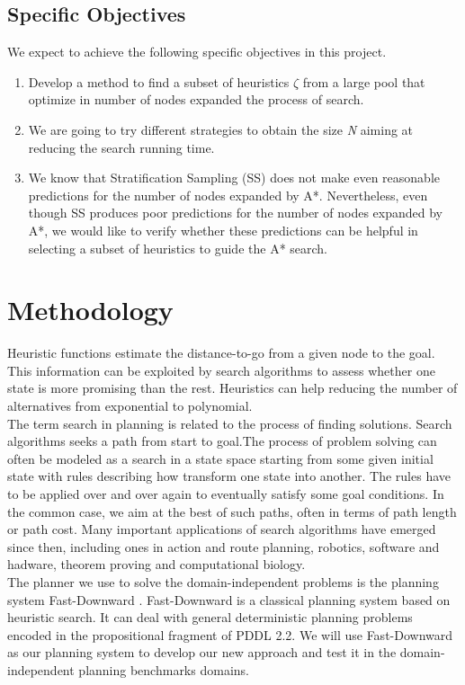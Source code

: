 \documentclass[a4paper,12pt]{article}
\begin{document}
\subsection{Specific Objectives}
We expect to achieve the following specific objectives in this project.
\begin{enumerate}
\item Develop a method to find a subset of heuristics $\zeta$ from a large pool that optimize in number of nodes expanded the process of search.
\item We are going to try different strategies to obtain the size \textit{N} aiming at reducing the search running time.
\item We know that Stratification Sampling (SS) does not make even reasonable predictions for the number of nodes expanded by A*. Nevertheless, even though SS produces poor predictions for the number of nodes expanded by A*, we would like to verify whether these predictions can be helpful in selecting a subset of heuristics to guide the A* search.
\end{enumerate}

\section{Methodology}
Heuristic functions estimate the distance-to-go from a given node to the goal. This information can be exploited by search algorithms to assess whether one state is more promising than the rest. Heuristics can help reducing the number of alternatives from exponential to polynomial.\\

The term search in planning is related to the process of finding solutions.       
Search algorithms seeks a path from start to goal.The process of problem solving can often be modeled as a search in a state space starting from some given initial state with rules describing how transform one state into another. The rules have to be applied over and over again to eventually satisfy some goal conditions. In the common case, we aim at the best of such paths, often in terms of path length or path cost. Many important applications of search algorithms have emerged since then, including ones in action and route planning, robotics, software and hadware, theorem proving and computational biology.\\

The planner we use to solve the domain-independent problems is the planning system Fast-Downward \citep{helmert2006fast}. Fast-Downward is a classical planning system based on heuristic search. It can deal with general deterministic planning problems encoded in the propositional fragment of PDDL 2.2. We will use Fast-Downward as our planning system to develop our new approach and test it in the domain-independent planning benchmarks domains.\\
\end{document}
